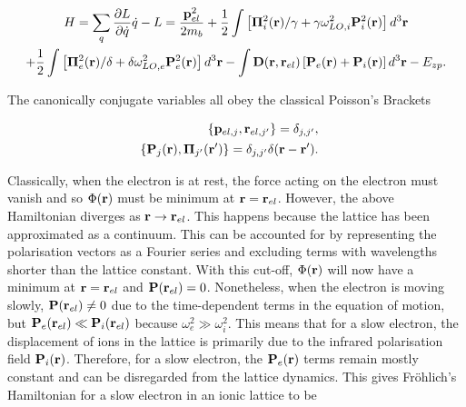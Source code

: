 \begin{equation}
    \begin{gathered}
        H = \sum_{q} \frac{\partial L}{\partial \dot{q}} \dot{q} - L = \frac{\vb{p}_{el}^2}{2 m_b} + \frac{1}{2} \int \left[\vb{\Pi}_{i}^2(\vb{r})/\gamma + \gamma\omega_{LO, i}^2 \vb{P}^2_i (\vb{r}) \right]
        d^3 \vb{r} 
        \\ + \frac{1}{2} \int \left[\vb{\Pi}_{e}^2(\vb{r})/\delta + \delta\omega_{LO, e}^2 \vb{P}^2_e (\vb{r}) \right] d^3 \vb{r} - \int \vb{D}(\vb{r},\vb{r}_{el})\left[\vb{P}_e(\vb{r})+\vb{P}_i(\vb{r})\right] d^3\vb{r} - E_{zp}.
    \end{gathered}
\end{equation}

The canonically conjugate variables all obey the classical Poisson's Brackets

\begin{subequations}
\begin{align}
    \begin{split}
        \left\{\vb{p}_{el, j}, \vb{r}_{el, j'}\right\} &= \delta_{j, j'},
    \end{split}\\
    \begin{split}
        \left\{\vb{P}_{j}(\vb{r}), \vb{\Pi}_{j'}(\vb{r'})\right\} &= \delta_{j, j'} \delta(\vb{r}-\vb{r'}).
    \end{split}
\end{align}
\end{subequations}

Classically, when the electron is at rest, the force acting on the electron must vanish and so $\Phi(\vb{r})$ must be minimum at $\vb{r} = \vb{r}_{el}$. However, the above Hamiltonian diverges as $\vb{r} \to \vb{r}_{el}$. This happens because the lattice has been approximated as a continuum. This can be accounted for by representing the polarisation vectors as a Fourier series and excluding terms with wavelengths shorter than the lattice constant. With this cut-off, $\Phi(\vb{r})$ will now have a minimum at $\vb{r} = \vb{r}_{el}$ and $\vb{P}(\vb{r}_{el}) = 0$. Nonetheless, when the electron is moving slowly, $\vb{P}(\vb{r}_{el}) \neq 0$ due to the time-dependent terms in the equation of motion, but $\vb{P}_e(\vb{r}_{el}) \ll \vb{P}_i(\vb{r}_{el})$ because $\omega^2_e \gg \omega^2_i$. This means that for a slow electron, the displacement of ions in the lattice is primarily due to the infrared polarisation field $\vb{P}_i(\vb{r})$. Therefore, for a slow electron, the $\vb{P}_e(\vb{r})$ terms remain mostly constant and can be disregarded from the lattice dynamics. This gives Fr\"ohlich's  Hamiltonian for a slow electron in an ionic lattice to be

